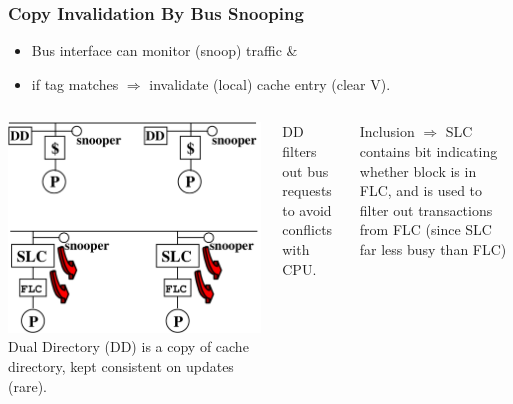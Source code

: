\documentclass{beamer}
\newcommand{\emp}[1]{\textcolor{DikuRed}{ #1}}
\begin{document}
\begin{frame}[fragile,t]
\frametitle{Copy Invalidation By Bus Snooping}


\begin{itemize}
    \item Bus interface can monitor (snoop) traffic \& 
    \item if tag matches $\Rightarrow$ invalidate (local) cache entry (clear V).
\end  {itemize}
\smallskip

\begin{columns}
\includegraphics[width=35ex]{Figures/FigsInfCoherence/SnoopingEg}
\pause
\emp{Dual Directory (DD)} is a copy of cache directory,
kept consistent on updates (rare).

DD filters out bus requests to avoid conflicts with CPU.

\bigskip
Inclusion $\Rightarrow$ \emp{SLC} contains bit indicating whether block is in FLC,
and is used to \emp{filter out transactions from FLC}
(since SLC far less busy than FLC) 
\end{columns} 

\smallskip

\end{frame}
\end{document}
